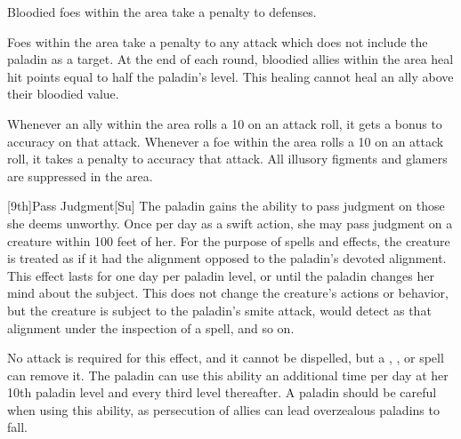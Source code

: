Bloodied foes within the area take a  penalty to defenses.

Foes within the area take a  penalty to any attack which does not include the paladin as a target.
At the end of each round, bloodied allies within the area heal hit points equal to half the paladin's level.
This healing cannot heal an ally above their bloodied value.

Whenever an ally within the area rolls a 10 on an attack roll, it gets a  bonus to accuracy on that attack.
Whenever a foe within the area rolls a 10 on an attack roll, it takes a  penalty to accuracy that attack.
All illusory figments and glamers are suppressed in the area.

[9th]{Pass Judgment}[Su]
The paladin gains the ability to pass judgment on those she deems unworthy.
Once per day as a swift action, she may pass judgment on a creature within 100 feet of her.
For the purpose of spells and effects, the creature is treated as if it had the alignment opposed to the paladin's devoted alignment.
This effect lasts for one day per paladin level, or until the paladin changes her mind about the subject.
This does not change the creature's actions or behavior, but the creature is subject to the paladin's smite attack, would detect as that alignment under the inspection of a  spell, and so on.

No attack is required for this effect, and it cannot be dispelled, but a , , or  spell can remove it.
The paladin can use this ability an additional time per day at her 10th paladin level and every third level thereafter.
A paladin should be careful when using this ability, as persecution of allies can lead overzealous paladins to fall.

